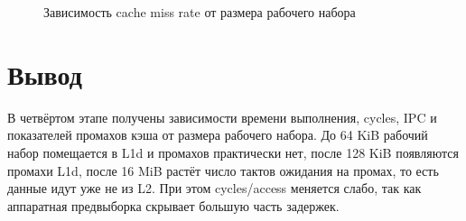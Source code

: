 \begin{figure}[H]
	\centering
	\caption{Зависимость cache miss rate от размера рабочего набора}
	\label{fig:working-set-miss-rate}
\end{figure}

\section{Вывод}

В четвёртом этапе получены зависимости времени выполнения, cycles, IPC и показателей промахов кэша от размера рабочего набора.
До 64 KiB рабочий набор помещается в L1d и промахов практически нет, после 128 KiB появляются промахи L1d, после 16 MiB растёт число тактов ожидания на промах, то есть данные идут уже не из L2.
При этом cycles/access меняется слабо, так как аппаратная предвыборка скрывает большую часть задержек.
